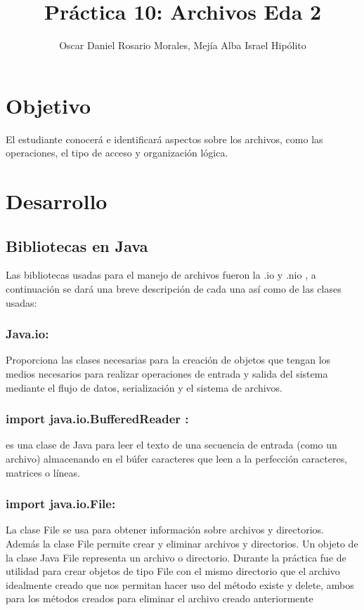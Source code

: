\documentclass[12pt,letterpaper]{article}
\author{Oscar Daniel Rosario Morales, Mejía Alba Israel Hipólito
}
\title{Práctica  10: Archivos Eda 2}
\begin{document}
\maketitle



\newpage

\section{Objetivo}
 
El estudiante conocerá e identificará aspectos sobre los archivos, como las operaciones, el tipo de acceso y organización lógica.

\section{Desarrollo}


\subsection{Bibliotecas en Java}

Las bibliotecas usadas para el manejo de archivos fueron la .io y .nio , a continuación se dará una breve descripción de cada una así como de las clases usadas:

\subsubsection{Java.io:}

Proporciona las clases necesarias para la creación de objetos que tengan los medios necesarios para realizar operaciones de entrada y salida del sistema mediante el flujo de datos, serialización y el sistema de archivos.

\subsubsection*{import java.io.BufferedReader :}

es una clase de Java para leer el texto de una secuencia de entrada (como un archivo) almacenando en el búfer caracteres que leen a la perfección caracteres, matrices o líneas.


\subsubsection*{import java.io.File:}

La clase File se usa para obtener información sobre archivos y directorios. 
Además la clase File permite crear y eliminar archivos y directorios.
Un objeto de la clase Java File representa un archivo o directorio.
Durante la práctica fue de utilidad para crear objetos de tipo File con el mismo directorio que el archivo idealmente creado que nos permitan hacer uso del método existe y delete, ambos para los métodos creados para eliminar el archivo creado anteriormente
\end{document}
